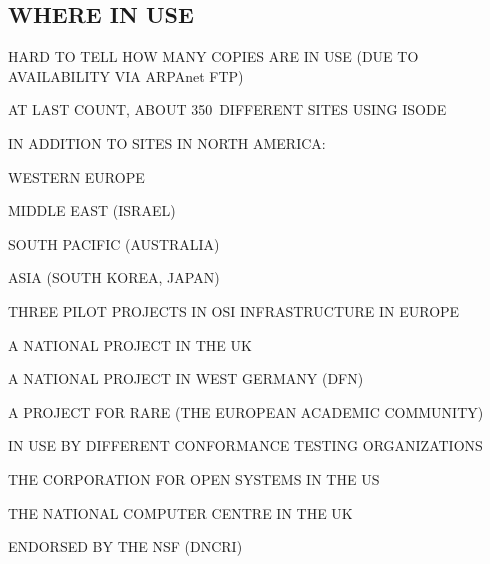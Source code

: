 \begin{bwslide}
\part*	{WHERE IN USE}\bf

\begin{nrtc}
\item	HARD TO TELL HOW MANY COPIES ARE IN USE (DUE TO AVAILABILITY VIA
	ARPAnet FTP)

\item	AT LAST COUNT, ABOUT 350~DIFFERENT SITES USING ISODE

\item	IN ADDITION TO SITES IN NORTH AMERICA:
    \begin{nrtc}
    \item	WESTERN EUROPE

    \item	MIDDLE EAST (ISRAEL)

    \item	SOUTH PACIFIC (AUSTRALIA)

    \item	ASIA (SOUTH KOREA, JAPAN)
    \end{nrtc}
\end{nrtc}
\end{bwslide}


\begin{bwslide}

\begin{nrtc}
\item	THREE PILOT PROJECTS IN OSI INFRASTRUCTURE IN EUROPE
    \begin{nrtc}
    \item	A NATIONAL PROJECT IN THE UK

    \item	A NATIONAL PROJECT IN WEST GERMANY (DFN)

    \item	A PROJECT FOR RARE (THE EUROPEAN ACADEMIC COMMUNITY)
    \end{nrtc}

\item	IN USE BY DIFFERENT CONFORMANCE TESTING ORGANIZATIONS
    \begin{nrtc}
    \item	THE CORPORATION FOR OPEN SYSTEMS IN THE US

    \item	THE NATIONAL COMPUTER CENTRE IN THE UK
    \end{nrtc}

\item	ENDORSED BY THE NSF (DNCRI)
\end{nrtc}
\end{bwslide}


